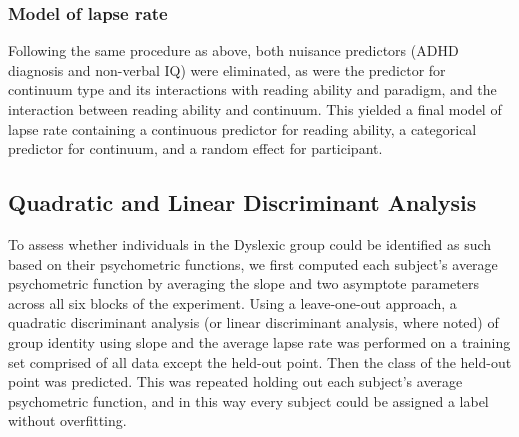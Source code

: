 \documentclass[..\uwthesis.tex]{subfiles}
\begin{document}
\subsubsection{Model of lapse rate}
Following the same procedure as above, both nuisance predictors (ADHD diagnosis and non-verbal IQ) were eliminated, as were the predictor for continuum type and its interactions with reading ability and paradigm, and the interaction between reading ability and continuum. This yielded a final model of lapse rate containing a continuous predictor for reading ability, a categorical predictor for continuum, and a random effect for participant.

\subsection{Quadratic and Linear Discriminant Analysis}
To assess whether individuals in the Dyslexic group could be identified as such based on their psychometric functions, we first computed each subject’s average psychometric function by averaging the slope and two asymptote parameters across all six blocks of the experiment. Using a leave-one-out approach, a quadratic discriminant analysis (or linear discriminant analysis, where noted) of group identity using slope and the average lapse rate was performed on a training set comprised of all data except the held-out point. Then the class of the held-out point was predicted. This was repeated holding out each subject’s average psychometric function, and in this way every subject could be assigned a label without overfitting.  
\end{document}

